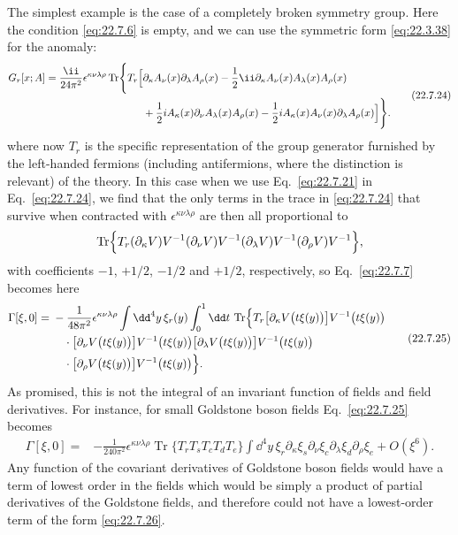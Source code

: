 The simplest example is the case of a completely broken symmetry group.
Here the condition \eqref{eq:22.7.6} is empty, and we can use the symmetric
form \eqref{eq:22.3.38} for the anomaly:
\begin{equation}
 \begin{aligned}
 G_r[x;A]
 =\frac{\ii}{24\pi^2}\epsilon^{\kappa\nu\lambda\rho}
 \operatorname{Tr}\Biggl\{T_r\Bigl[
 &\partial_\kappa A_\nu(x)\partial_\lambda A_\rho(x)
 -\frac{1}{2}\ii\partial_\kappa A_\nu(x)A_\lambda(x)A_\rho(x)
 \\
 &+\frac{1}{2}iA_\kappa(x)\partial_\nu A_\lambda(x)A_\rho(x)
 -\frac{1}{2}iA_\kappa(x)A_\nu(x)\partial_\lambda A_\rho(x)
 \Bigr]\Biggr\}.
 \end{aligned}
 \tag{22.7.24}\label{eq:22.7.24}
\end{equation}
where now $T_r$ is the specific representation of the group generator
furnished by the left-handed fermions (including antifermions, where the
distinction is relevant) of the theory. In this case when we use
Eq.~\eqref{eq:22.7.21} in Eq.~\eqref{eq:22.7.24}, we find that the only
terms in the trace in \eqref{eq:22.7.24} that survive when contracted with
$\epsilon^{\kappa\nu\lambda\rho}$ are then all proportional to
\[
 \operatorname{Tr}\Bigl\{
 T_r(\partial_\kappa V)V^{-1}(\partial_\nu V)V^{-1}
 (\partial_\lambda V)V^{-1}(\partial_\rho V)V^{-1}
 \Bigr\},
\]
with coefficients $-1$, $+1/2$, $-1/2$ and $+1/2$, respectively, so
Eq.~\eqref{eq:22.7.7} becomes here
\begin{equation}
 \begin{aligned}
 \Gamma[\xi,0]
 ={}&-\frac{1}{48\pi^2}\epsilon^{\kappa\nu\lambda\rho}
 \int \dd^4y\,\xi_r(y)\int_0^1\dd t\,
 \operatorname{Tr}\Bigl\{
 T_r\bigl[\partial_\kappa V\bigl(t\xi(y)\bigr)\bigr]
 V^{-1}\bigl(t\xi(y)\bigr)
 \\
 &\quad{}\cdot
 \bigl[\partial_\nu V\bigl(t\xi(y)\bigr)\bigr]
 V^{-1}\bigl(t\xi(y)\bigr)
 \bigl[\partial_\lambda V\bigl(t\xi(y)\bigr)\bigr]
 V^{-1}\bigl(t\xi(y)\bigr)
 \\
 &\quad{}\cdot
 \bigl[\partial_\rho V\bigl(t\xi(y)\bigr)\bigr]
 V^{-1}\bigl(t\xi(y)\bigr)
 \Bigr\}.
 \end{aligned}
 \tag{22.7.25}\label{eq:22.7.25}
\end{equation}
As promised, this is not the integral of an invariant function of fields
and field derivatives. For instance, for small Goldstone boson fields
Eq.~\eqref{eq:22.7.25} becomes
\begin{equation}
 \begin{aligned}
 \Gamma[\xi,0]
 ={}&-\frac{1}{240\pi^2}\epsilon^{\kappa\nu\lambda\rho}
 \operatorname{Tr}\{T_rT_sT_cT_dT_e\}
 \int \dd^4y\,\xi_r\partial_\kappa\xi_s\partial_\nu\xi_c
 \partial_\lambda\xi_d\partial_\rho\xi_e
 +O(\xi^6).
 \end{aligned}
 \tag{22.7.26}\label{eq:22.7.26}
\end{equation}
Any function of the covariant derivatives of Goldstone boson fields would
have a term of lowest order in the fields which would be simply a product
of partial derivatives of the Goldstone fields, and therefore could not
have a lowest-order term of the form \eqref{eq:22.7.26}.

